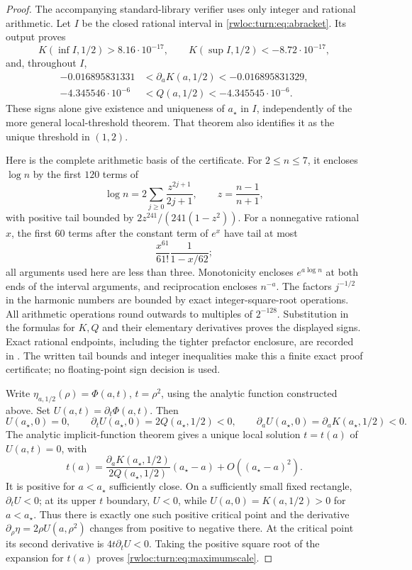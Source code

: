 \begin{proof}
The accompanying standard-library verifier
 uses only integer and rational
arithmetic. Let $I$ be the closed rational interval in
\eqref{rwloc:turn:eq:abracket}. Its output proves
\[
 K(\inf I,1/2)>8.16\cdot10^{-17},\qquad
 K(\sup I,1/2)<-8.72\cdot10^{-17},
\]
and, throughout $I$,
\begin{align*}
 -0.016895831331&<\partial_aK(a,1/2)<-0.016895831329,\\
 -4.345546\cdot10^{-6}&<Q(a,1/2)<-4.345545\cdot10^{-6}.
\end{align*}
These signs alone give existence and uniqueness of $a_\star$ in
$I$, independently of the more general local-threshold theorem.
That theorem also identifies it as the unique threshold in $(1,2)$.

Here is the complete arithmetic basis of the certificate. For
$2\leq n\leq7$, it encloses $\log n$ by the first $120$ terms of
\[
 \log n=2\sum_{j\geq0}\frac{z^{2j+1}}{2j+1},
 \qquad z=\frac{n-1}{n+1},
\]
with positive tail bounded by
$2z^{241}/(241(1-z^2))$. For a nonnegative rational $x$, the first
$60$ terms after the constant term of $e^x$ have tail at most
\[
 \frac{x^{61}}{61!}\frac1{1-x/62};
\]
all arguments used here are less than three. Monotonicity encloses
$e^{a\log n}$ at both ends of the interval arguments, and reciprocation
encloses $n^{-a}$. The factors $j^{-1/2}$ in the harmonic numbers are
bounded by exact integer-square-root operations. All arithmetic
operations round outwards to multiples of $2^{-128}$. Substitution
in the formulas for $K,Q$ and their elementary derivatives proves the
displayed signs. Exact rational endpoints, including the tighter
prefactor enclosure, are recorded in
. The written tail bounds
and integer inequalities make this a finite exact proof certificate;
no floating-point sign decision is used.

Write $\eta_{a,1/2}(\rho)=\Phi(a,t)$, $t=\rho^2$, using the
analytic function constructed above. Set $U(a,t)=\partial_t\Phi(a,t)$.
Then
\[
 U(a_\star,0)=0,\qquad
 \partial_tU(a_\star,0)=2Q(a_\star,1/2)<0,\qquad
 \partial_aU(a_\star,0)=\partial_aK(a_\star,1/2)<0.
\]
The analytic implicit-function theorem gives a unique local solution
$t=t(a)$ of $U(a,t)=0$, with
\[
 t(a)=\frac{\partial_aK(a_\star,1/2)}{2Q(a_\star,1/2)}
          (a_\star-a)+O((a_\star-a)^2).
\]
It is positive for $a<a_\star$ sufficiently close. On a sufficiently
small fixed rectangle, $\partial_tU<0$; at its upper $t$ boundary,
$U<0$, while $U(a,0)=K(a,1/2)>0$ for $a<a_\star$. Thus there
is exactly one such positive critical point and the derivative
$\partial_\rho\eta=2\rho U(a,\rho^2)$ changes from positive
to negative there. At the critical point its second derivative is
$4t\partial_tU<0$. Taking the positive square root of the expansion
for $t(a)$ proves \eqref{rwloc:turn:eq:maximumscale}.
\end{proof}

